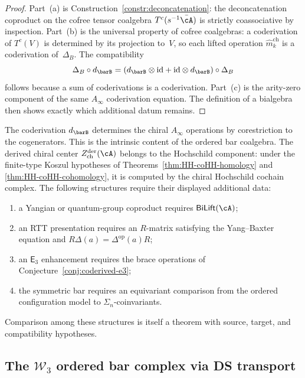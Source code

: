 \begin{proof}
Part~\textup{(a)} is Construction~\ref{constr:deconcatenation}: the
deconcatenation coproduct on the cofree tensor coalgebra
$T^c(s^{-1}\bar\cA)$ is strictly coassociative by inspection.
Part~\textup{(b)} is the universal property of cofree coalgebras:
a coderivation of $T^c(V)$ is determined by its projection
to~$V$, so each lifted operation $\hat{m}_k^{\mathrm{ch}}$
is a coderivation of~$\Delta_B$.
The compatibility
\[
\Delta_B\circ d_{\barB}
=
(d_{\barB}\otimes\id+\id\otimes d_{\barB})\circ\Delta_B
\]
follows because a sum of coderivations is a coderivation.
Part~\textup{(c)} is the arity-zero component of the same
$A_\infty$ coderivation equation.  The definition of a bialgebra then
shows exactly which additional datum remains.
\end{proof}

\begin{remark}
\label{rem:coderived-bialgebra-hochschild-readouts}%
%
%
The coderivation $d_{\barB}$ determines the chiral
$A_\infty$ operations by corestriction to the cogenerators.  This is
the intrinsic content of the ordered bar coalgebra.
The derived chiral center
$Z^{\mathrm{der}}_{\mathrm{ch}}(\cA)$ belongs to the Hochschild component:
under the finite-type Koszul hypotheses of
Theorems~\ref{thm:HH-coHH-homology} and
\ref{thm:HH-coHH-cohomology}, it is computed by the chiral
Hochschild cochain complex.  The following structures require their
displayed additional data:
\begin{enumerate}[label=\textup{(\alph*)}]
\item a Yangian or quantum-group coproduct requires
$\mathsf{BiLift}(\cA)$;
\item an RTT presentation requires an $R$-matrix satisfying the
Yang--Baxter equation and
$R\Delta(a)=\Delta^{\mathrm{op}}(a)R$;
\item an $\mathsf E_3$ enhancement requires the brace operations of
Conjecture~\ref{conj:coderived-e3};
\item the symmetric bar requires an equivariant comparison from the
ordered configuration model to $\Sigma_n$-coinvariants.
\end{enumerate}
Comparison among these structures is itself a theorem with source,
target, and compatibility hypotheses.
\end{remark}

\subsection{The \texorpdfstring{$\mathcal{W}_3$}{W\_3} ordered bar complex via DS transport}
\label{subsec:w3-ordered-bar-ds}

